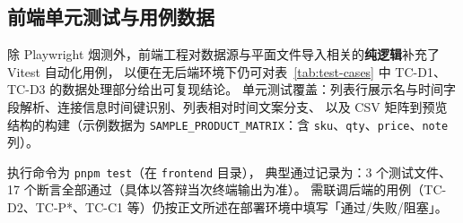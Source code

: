 
\subsection{前端单元测试与用例数据}

除 Playwright 烟测外，前端工程对数据源与平面文件导入相关的\textbf{纯逻辑}补充了 Vitest 自动化用例，
以便在无后端环境下仍可对表~\ref{tab:test-cases} 中 TC-D1、TC-D3 的数据处理部分给出可复现结论。
单元测试覆盖：列表行展示名与时间字段解析、连接信息时间键识别、列表相对时间文案分支、
以及 CSV 矩阵到预览结构的构建（示例数据为 \texttt{SAMPLE\_PRODUCT\_MATRIX}：含 \texttt{sku}、\texttt{qty}、\texttt{price}、\texttt{note} 列）。

执行命令为 \texttt{pnpm test}（在 \texttt{frontend} 目录），
典型通过记录为：3 个测试文件、17 个断言全部通过（具体以答辩当次终端输出为准）。
需联调后端的用例（TC-D2、TC-P*、TC-C1 等）仍按正文所述在部署环境中填写「通过/失败/阻塞」。
